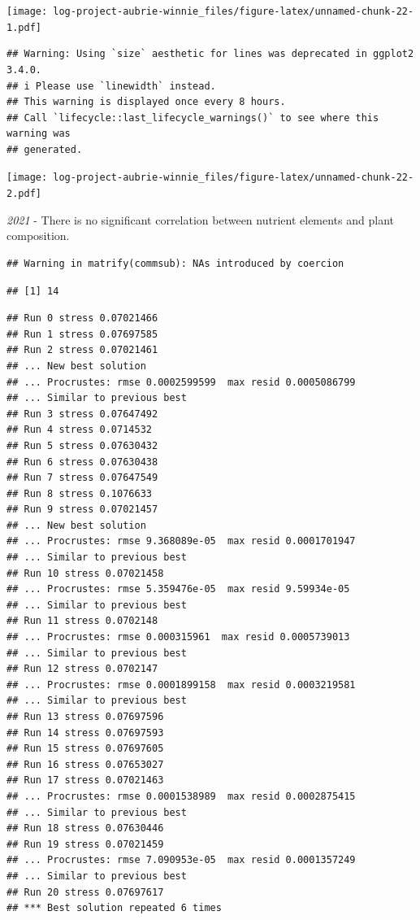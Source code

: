 \documentclass[
]{article}
\begin{document}
\texttt{[image: log-project-aubrie-winnie\_files/figure-latex/unnamed-chunk-22-1.pdf]}

\begin{verbatim}
## Warning: Using `size` aesthetic for lines was deprecated in ggplot2 3.4.0.
## i Please use `linewidth` instead.
## This warning is displayed once every 8 hours.
## Call `lifecycle::last_lifecycle_warnings()` to see where this warning was
## generated.
\end{verbatim}

\texttt{[image: log-project-aubrie-winnie\_files/figure-latex/unnamed-chunk-22-2.pdf]}

\emph{2021} - There is no significant correlation between nutrient
elements and plant composition.

\begin{verbatim}
## Warning in matrify(commsub): NAs introduced by coercion
\end{verbatim}

\begin{verbatim}
## [1] 14
\end{verbatim}

\begin{verbatim}
## Run 0 stress 0.07021466 
## Run 1 stress 0.07697585 
## Run 2 stress 0.07021461 
## ... New best solution
## ... Procrustes: rmse 0.0002599599  max resid 0.0005086799 
## ... Similar to previous best
## Run 3 stress 0.07647492 
## Run 4 stress 0.0714532 
## Run 5 stress 0.07630432 
## Run 6 stress 0.07630438 
## Run 7 stress 0.07647549 
## Run 8 stress 0.1076633 
## Run 9 stress 0.07021457 
## ... New best solution
## ... Procrustes: rmse 9.368089e-05  max resid 0.0001701947 
## ... Similar to previous best
## Run 10 stress 0.07021458 
## ... Procrustes: rmse 5.359476e-05  max resid 9.59934e-05 
## ... Similar to previous best
## Run 11 stress 0.0702148 
## ... Procrustes: rmse 0.000315961  max resid 0.0005739013 
## ... Similar to previous best
## Run 12 stress 0.0702147 
## ... Procrustes: rmse 0.0001899158  max resid 0.0003219581 
## ... Similar to previous best
## Run 13 stress 0.07697596 
## Run 14 stress 0.07697593 
## Run 15 stress 0.07697605 
## Run 16 stress 0.07653027 
## Run 17 stress 0.07021463 
## ... Procrustes: rmse 0.0001538989  max resid 0.0002875415 
## ... Similar to previous best
## Run 18 stress 0.07630446 
## Run 19 stress 0.07021459 
## ... Procrustes: rmse 7.090953e-05  max resid 0.0001357249 
## ... Similar to previous best
## Run 20 stress 0.07697617 
## *** Best solution repeated 6 times
\end{verbatim}
\end{document}
